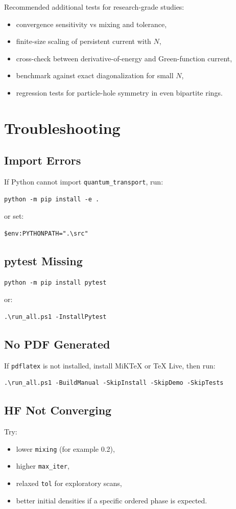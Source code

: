 \documentclass[11pt,a4paper]{article}
\begin{document}
Recommended additional tests for research-grade studies:
\begin{itemize}[leftmargin=1.5em]
  \item convergence sensitivity vs mixing and tolerance,
  \item finite-size scaling of persistent current with \(N\),
  \item cross-check between derivative-of-energy and Green-function current,
  \item benchmark against exact diagonalization for small \(N\),
  \item regression tests for particle-hole symmetry in even bipartite rings.
\end{itemize}

\section{Troubleshooting}
\subsection{Import Errors}
If Python cannot import \texttt{quantum\_transport}, run:
\begin{lstlisting}[style=ps]
python -m pip install -e .
\end{lstlisting}
or set:
\begin{lstlisting}[style=ps]
$env:PYTHONPATH=".\src"
\end{lstlisting}

\subsection{pytest Missing}
\begin{lstlisting}[style=ps]
python -m pip install pytest
\end{lstlisting}
or:
\begin{lstlisting}[style=ps]
.\run_all.ps1 -InstallPytest
\end{lstlisting}

\subsection{No PDF Generated}
If \texttt{pdflatex} is not installed, install MiKTeX or TeX Live, then run:
\begin{lstlisting}[style=ps]
.\run_all.ps1 -BuildManual -SkipInstall -SkipDemo -SkipTests
\end{lstlisting}

\subsection{HF Not Converging}
Try:
\begin{itemize}[leftmargin=1.5em]
  \item lower \texttt{mixing} (for example 0.2),
  \item higher \texttt{max\_iter},
  \item relaxed \texttt{tol} for exploratory scans,
  \item better initial densities if a specific ordered phase is expected.
\end{itemize}
\end{document}

